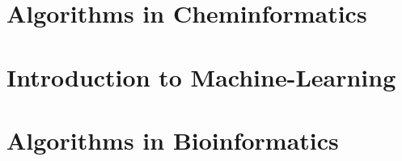 \documentclass[a4paper,11pt]{scrartcl}
\begin{document}
\newpage\section{Algorithms in Cheminformatics}

\newpage\section{Introduction to Machine-Learning}

\newpage\section{Algorithms in Bioinformatics}
\end{document}
